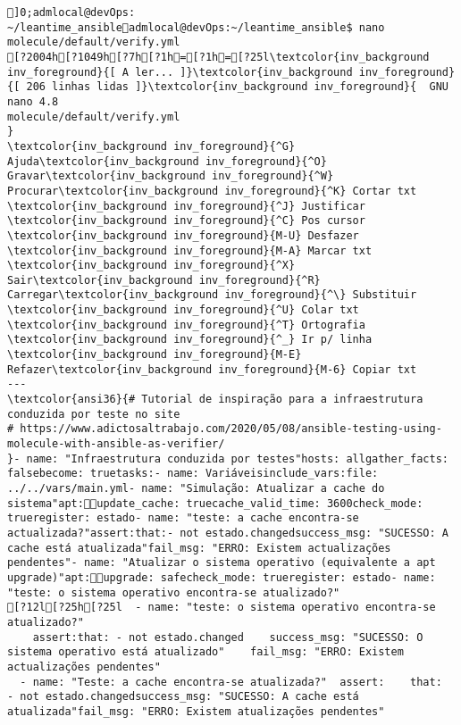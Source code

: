 \documentclass{scrartcl}
\title{}
\begin{document}
\begin{Verbatim}
]0;admlocal@devOps: ~/leantime_ansibleadmlocal@devOps:~/leantime_ansible$ nano molecule/default/verify.yml 
[?2004h[?1049h[?7h[?1h=[?1h=[?25l\textcolor{inv_background inv_foreground}{[ A ler... ]}\textcolor{inv_background inv_foreground}{[ 206 linhas lidas ]}\textcolor{inv_background inv_foreground}{  GNU nano 4.8                                          molecule/default/verify.yml                                                       }
\textcolor{inv_background inv_foreground}{^G} Ajuda\textcolor{inv_background inv_foreground}{^O} Gravar\textcolor{inv_background inv_foreground}{^W} Procurar\textcolor{inv_background inv_foreground}{^K} Cortar txt    \textcolor{inv_background inv_foreground}{^J} Justificar    \textcolor{inv_background inv_foreground}{^C} Pos cursor    \textcolor{inv_background inv_foreground}{M-U} Desfazer     \textcolor{inv_background inv_foreground}{M-A} Marcar txt
\textcolor{inv_background inv_foreground}{^X} Sair\textcolor{inv_background inv_foreground}{^R} Carregar\textcolor{inv_background inv_foreground}{^\} Substituir    \textcolor{inv_background inv_foreground}{^U} Colar txt     \textcolor{inv_background inv_foreground}{^T} Ortografia    \textcolor{inv_background inv_foreground}{^_} Ir p/ linha   \textcolor{inv_background inv_foreground}{M-E} Refazer\textcolor{inv_background inv_foreground}{M-6} Copiar txt
---
\textcolor{ansi36}{# Tutorial de inspiração para a infraestrutura conduzida por teste no site
# https://www.adictosaltrabajo.com/2020/05/08/ansible-testing-using-molecule-with-ansible-as-verifier/
}- name: "Infraestrutura conduzida por testes"hosts: allgather_facts: falsebecome: truetasks:- name: Variáveisinclude_vars:file: ../../vars/main.yml- name: "Simulação: Atualizar a cache do sistema"apt:update_cache: truecache_valid_time: 3600check_mode: trueregister: estado- name: "teste: a cache encontra-se actualizada?"assert:that:- not estado.changedsuccess_msg: "SUCESSO: A cache está atualizada"fail_msg: "ERRO: Existem actualizações pendentes"- name: "Atualizar o sistema operativo (equivalente a apt upgrade)"apt:upgrade: safecheck_mode: trueregister: estado- name: "teste: o sistema operativo encontra-se atualizado?"
[?12l[?25h[?25l  - name: "teste: o sistema operativo encontra-se atualizado?"
    assert:that: - not estado.changed    success_msg: "SUCESSO: O sistema operativo está atualizado"    fail_msg: "ERRO: Existem actualizações pendentes"
  - name: "Teste: a cache encontra-se atualizada?"  assert:    that:  - not estado.changedsuccess_msg: "SUCESSO: A cache está atualizada"fail_msg: "ERRO: Existem atualizações pendentes"

\end{Verbatim}
\end{document}
